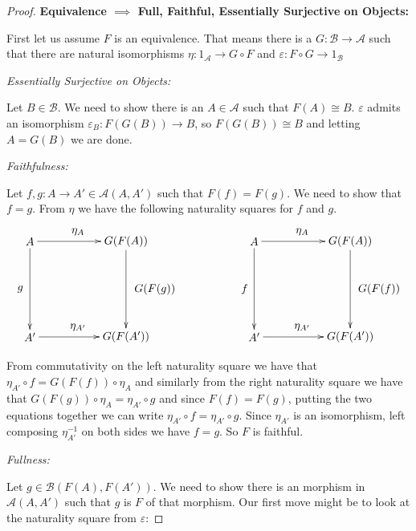 \documentclass[11pt]{article}
\theoremstyle{definition}
\theoremstyle{plain}
\theoremstyle{plain}
\theoremstyle{plain}
\begin{document}
\begin{proof}

\textbf{Equivalence $\implies$ Full, Faithful, Essentially Surjective on Objects:} 

First let us assume $F$ is an equivalence. That means there is a $G:\mathscr{B}\to\mathscr{A}$ such that there are natural isomorphisms $\eta: 1_{\mathscr{A}} \to G\circ F$ and $\varepsilon: F \circ G \to 1_{\mathscr{B}}$

\emph{Essentially Surjective on Objects:}

Let $B\in\mathscr{B}$. We need to show there is an $A\in\mathscr{A}$ such that $F(A)\cong B$. $\varepsilon$ admits an isomorphism $\varepsilon_{B} : F(G(B)) \to B$, so $F(G(B))\cong B$ and letting $A=G(B)$ we are done.

\emph{Faithfulness:}

Let $f,g:A\to A' \in \mathscr{A}(A, A')$ such that $F(f)=F(g)$. We need to show that $f=g$. From $\eta$ we have the following naturality squares for $f$ and $g$.

\begin{equation*}
\begin{xy}
(0,0)*+{A}="a"; (30,0)*+{G(F(A))}="gfa";%
(0,-30)*+{A'}="ap"; (30,-30)*+{G(F(A'))}="gfap";
(70,0)*+{A}="a2"; (100,0)*+{G(F(A))}="gfa2";%
(70,-30)*+{A'}="ap2"; (100,-30)*+{G(F(A'))}="gfap2";
{\ar "a"; "gfa"}?*!/_3mm/{\eta_{A}};
{\ar "a"; "ap"}?*!/^3mm/{g};
{\ar "ap"; "gfap"}?*!/_3mm/{\eta_{A'}};
{\ar "gfa";"gfap"}?*!/_9mm/{G(F(g))};
{\ar "a2"; "gfa2"}?*!/_3mm/{\eta_{A}};
{\ar "a2"; "ap2"}?*!/^3mm/{f};
{\ar "ap2"; "gfap2"}?*!/_3mm/{\eta_{A'}};
{\ar "gfa2";"gfap2"}?*!/_9mm/{G(F(f))};
\end{xy}
\end{equation*}

From commutativity on the left naturality square we have that $\eta_{A'} \circ f = G(F(f)) \circ \eta_{A}$ and similarly from the right naturality square we have that $G(F(g)) \circ \eta_{A} = \eta_{A'} \circ g$ and since $F(f)=F(g)$, putting the two equations together  we can write $\eta_{A'} \circ f = \eta_{A'} \circ g$. Since $\eta_{A'}$ is an isomorphism, 
left composing $\eta_{A'}^{-1}$ on both sides we have $f=g$. So $F$ is faithful.

\emph{Fullness:}

Let $g\in\mathscr{B}(F(A),F(A'))$. We need to show there is an morphism in $\mathscr{A}(A,A')$ such that $g$ is $F$ of that morphism. Our first move might be to look at the naturality square from $\varepsilon$:


\end{proof}
\end{document}
